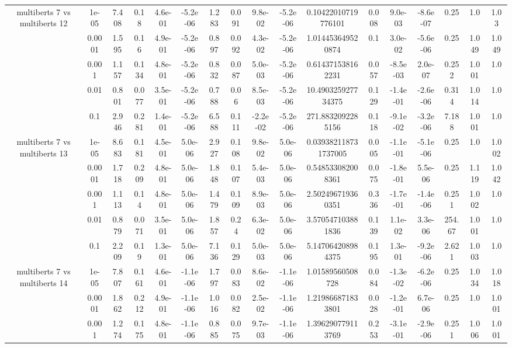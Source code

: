 \begin{tabular}{|c|c|c|c|c|c|c|c|c|c|c|c|c|c|c|c|c|}
\hline
\multirow{5}{*}{multiberts 7 vs multiberts 12} & 1e-05 & 7.408 & 0.18 & 4.6e-01 & -5.2e-06 & 1.283 & 0.091 & 9.8e-02 & -5.2e-06 & 0.10422010719776101 & 0.008 & 9.0e-03 & -8.6e-07 & 0.25 & 1.0 & 1.03 \\
 & 0.0001 & 1.595 & 0.16 & 4.9e-01 & -5.2e-06 & 0.897 & 0.092 & 4.3e-02 & -5.2e-06 & 1.014453649520874 & 0.1 & 3.0e-02 & -5.6e-06 & 0.25 & 1.049 & 1.049 \\
 & 0.001 & 1.157 & 0.134 & 4.8e-01 & -5.2e-06 & 0.832 & 0.087 & 5.0e-03 & -5.2e-06 & 0.614371538162231 & 0.057 & -8.5e-03 & 2.0e-07 & 0.252 & 1.001 & 1.0 \\
 & 0.01 & 0.801 & 0.077 & 3.5e-01 & -5.2e-06 & 0.788 & 0.06 & 8.5e-03 & -5.2e-06 & 10.490325927734375 & 0.129 & -1.4e-01 & -2.6e-06 & 0.314 & 1.014 & 1.0 \\
 & 0.1 & 2.946 & 0.281 & 1.4e-01 & -5.2e-06 & 6.588 & 0.111 & -2.2e-02 & -5.2e-06 & 271.8832092285156 & 0.118 & -9.1e-02 & -3.2e-06 & 7.188 & 1.001 & 1.0 \\
\hline
\multirow{5}{*}{multiberts 7 vs multiberts 13} & 1e-05 & 8.683 & 0.181 & 4.5e-01 & 5.0e-06 & 2.927 & 0.108 & 9.8e-02 & 5.0e-06 & 0.039382118731737005 & 0.005 & -1.1e-01 & -5.1e-06 & 0.25 & 1.0 & 1.002 \\
 & 0.0001 & 1.718 & 0.209 & 4.8e-01 & 5.0e-06 & 1.848 & 0.107 & 5.4e-03 & 5.0e-06 & 0.548533082008361 & 0.075 & -1.8e-01 & 5.5e-06 & 0.25 & 1.119 & 1.042 \\
 & 0.001 & 1.113 & 0.14 & 4.8e-01 & 5.0e-06 & 1.479 & 0.109 & 8.9e-03 & 5.0e-06 & 2.502496719360351 & 0.336 & -1.7e-01 & -1.4e-06 & 0.251 & 1.002 & 1.0 \\
 & 0.01 & 0.879 & 0.071 & 3.5e-01 & 5.0e-06 & 1.857 & 0.24 & 6.3e-02 & 5.0e-06 & 3.570547103881836 & 0.139 & 1.1e-02 & 3.3e-06 & 254.67 & 1.001 & 1.0 \\
 & 0.1 & 2.209 & 0.19 & 1.3e-01 & 5.0e-06 & 7.136 & 0.129 & 5.0e-03 & 5.0e-06 & 5.147064208984375 & 0.195 & 1.3e-01 & -9.2e-06 & 2.621 & 1.003 & 1.0 \\
\hline
\multirow{5}{*}{multiberts 7 vs multiberts 14} & 1e-05 & 7.807 & 0.161 & 4.6e-01 & -1.1e-06 & 1.797 & 0.083 & 8.6e-02 & -1.1e-06 & 1.01589560508728 & 0.084 & -1.3e-02 & -6.2e-06 & 0.25 & 1.034 & 1.018 \\
 & 0.0001 & 1.862 & 0.212 & 4.9e-01 & -1.1e-06 & 1.016 & 0.082 & 2.5e-02 & -1.1e-06 & 1.219866871833801 & 0.028 & -1.2e-01 & 6.7e-06 & 0.25 & 1.0 & 1.001 \\
 & 0.001 & 1.274 & 0.175 & 4.8e-01 & -1.1e-06 & 0.885 & 0.075 & 9.7e-03 & -1.1e-06 & 1.396290779113769 & 0.253 & -3.1e-01 & -2.9e-06 & 0.251 & 1.006 & 1.001 \\

\end{tabular}
